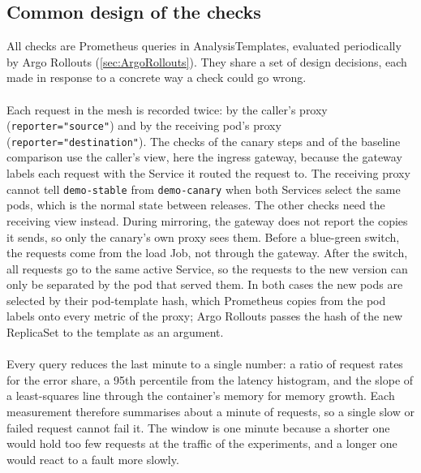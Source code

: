 \subsection{Common design of the checks}
\label{sec:DesignChecks}
All checks are Prometheus queries in AnalysisTemplates, evaluated periodically by Argo Rollouts (\autoref{sec:ArgoRollouts}). They share a set of design decisions, each made in response to a concrete way a check could go wrong.

\paragraph{} Each request in the mesh is recorded twice: by the caller's proxy (\texttt{reporter="source"}) and by the receiving pod's proxy (\texttt{reporter="destination"}). The checks of the canary steps and of the baseline comparison use the caller's view, here the ingress gateway, because the gateway labels each request with the Service it routed the request to. The receiving proxy cannot tell \texttt{demo-stable} from \texttt{demo-canary} when both Services select the same pods, which is the normal state between releases. The other checks need the receiving view instead. During mirroring, the gateway does not report the copies it sends, so only the canary's own proxy sees them. Before a blue-green switch, the requests come from the load Job, not through the gateway. After the switch, all requests go to the same active Service, so the requests to the new version can only be separated by the pod that served them. In both cases the new pods are selected by their pod-template hash, which Prometheus copies from the pod labels onto every metric of the proxy; Argo Rollouts passes the hash of the new ReplicaSet to the template as an argument.

\paragraph{} Every query reduces the last minute to a single number: a ratio of request rates for the error share, a 95th percentile from the latency histogram, and the slope of a least-squares line through the container's memory for memory growth. Each measurement therefore summarises about a minute of requests, so a single slow or failed request cannot fail it. The window is one minute because a shorter one would hold too few requests at the traffic of the experiments, and a longer one would react to a fault more slowly.


